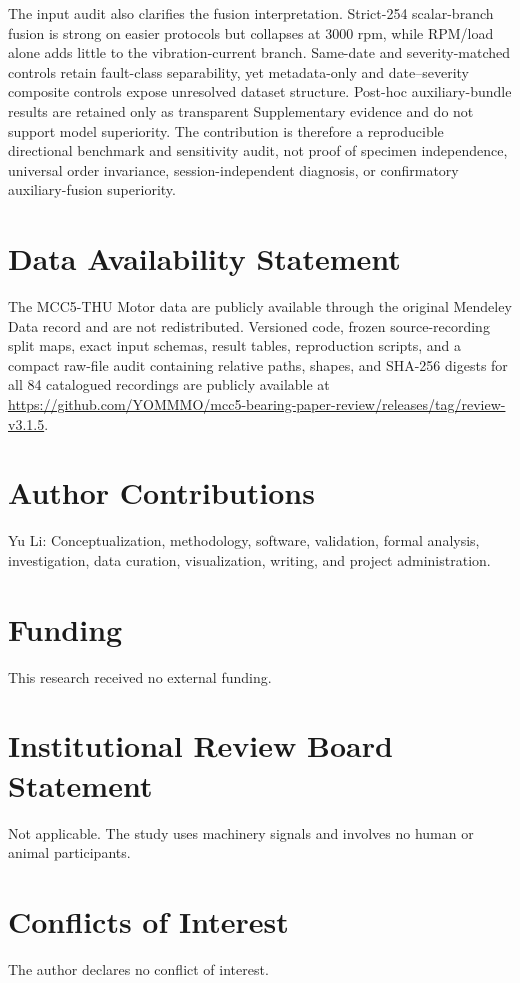 \documentclass[11pt]{article}
\begin{document}
The input audit also clarifies the fusion interpretation. Strict-254 scalar-branch fusion is strong on easier protocols but collapses at 3000 rpm, while RPM/load alone adds little to the vibration-current branch. Same-date and severity-matched controls retain fault-class separability, yet metadata-only and date--severity composite controls expose unresolved dataset structure. Post-hoc auxiliary-bundle results are retained only as transparent Supplementary evidence and do not support model superiority. The contribution is therefore a reproducible directional benchmark and sensitivity audit, not proof of specimen independence, universal order invariance, session-independent diagnosis, or confirmatory auxiliary-fusion superiority.

\section*{Data Availability Statement}
The MCC5-THU Motor data are publicly available through the original Mendeley Data record \cite{Chen2025MCC5Mendeley} and are not redistributed. Versioned code, frozen source-recording split maps, exact input schemas, result tables, reproduction scripts, and a compact raw-file audit containing relative paths, shapes, and SHA-256 digests for all 84 catalogued recordings are publicly available at \url{https://github.com/YOMMMO/mcc5-bearing-paper-review/releases/tag/review-v3.1.5}.

\section*{Author Contributions}
Yu Li: Conceptualization, methodology, software, validation, formal analysis, investigation, data curation, visualization, writing, and project administration.

\section*{Funding}
This research received no external funding.

\section*{Institutional Review Board Statement}
Not applicable. The study uses machinery signals and involves no human or animal participants.

\section*{Conflicts of Interest}
The author declares no conflict of interest.
\end{document}
